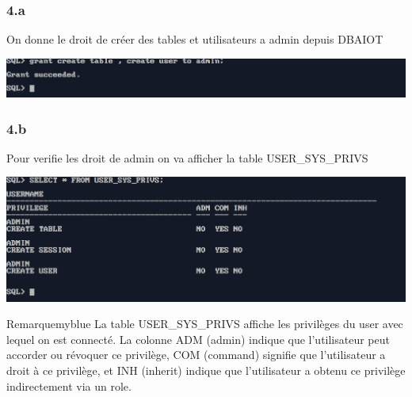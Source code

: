 \subsubsection*{4.a}
On donne le droit de créer des tables et utilisateurs a admin depuis DBAIOT



\begin{center}
    \includegraphics[width=\textwidth]{ScreenShot/Partie4/grant1.png}
\end{center}

\subsubsection*{4.b}
Pour verifie les droit de admin on va afficher la table USER\_SYS\_PRIVS 



\begin{center}
    \includegraphics[width=\textwidth]{ScreenShot/Partie4/verify1.png}
\end{center}

\begin{prettyBox}{Remarque}{myblue}
La table USER\_SYS\_PRIVS affiche les privilèges du user avec lequel on
est connecté. La colonne ADM (admin) indique que l'utilisateur peut accorder 
ou révoquer ce privilège, COM (command) signifie que l'utilisateur a droit
à ce privilège, et INH (inherit) indique que l'utilisateur a obtenu ce privilège 
indirectement via un role.
\end{prettyBox}

